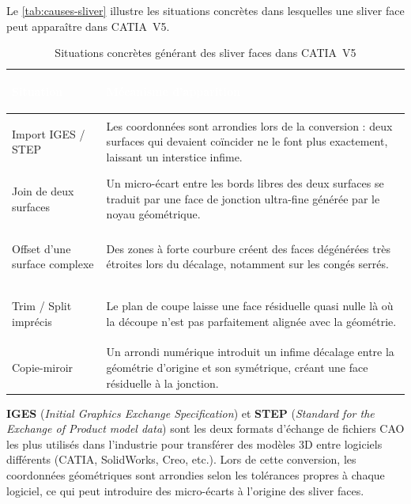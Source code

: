 Le \autoref{tab:causes-sliver} illustre les situations concrètes dans lesquelles une sliver face peut apparaître dans CATIA~V5.

\begin{table}[H]
    \centering
    \caption{Situations concrètes générant des sliver faces dans CATIA~V5}
    \label{tab:causes-sliver}
    \begin{tabularx}{\textwidth}{|>{\bfseries\raggedright\arraybackslash}p{3.8cm}|X|}
        \hline
        \rowcolor{headerblue}
        \textcolor{white}{\textbf{Situation}} & \centering\textcolor{white}{\textbf{Mécanisme d'apparition}} \tabularnewline
        \hline
        \rowcolor{rowlight}
        Import IGES / STEP & Les coordonnées sont arrondies lors de la conversion : deux surfaces qui devaient coïncider ne le font plus exactement, laissant un interstice infime. \\
        \hline
        \rowcolor{rowwhite}
        Join de deux surfaces & Un micro-écart entre les bords libres des deux surfaces se traduit par une face de jonction ultra-fine générée par le noyau géométrique. \\
        \hline
        \rowcolor{rowlight}
        Offset d'une surface complexe & Des zones à forte courbure créent des faces dégénérées très étroites lors du décalage, notamment sur les congés serrés. \\
        \hline
        \rowcolor{rowwhite}
        Trim / Split imprécis & Le plan de coupe laisse une face résiduelle quasi nulle là où la découpe n'est pas parfaitement alignée avec la géométrie. \\
        \hline
        \rowcolor{rowlight}
        Copie-miroir & Un arrondi numérique introduit un infime décalage entre la géométrie d'origine et son symétrique, créant une face résiduelle à la jonction. \\
        \hline
    \end{tabularx}
\end{table}

\begin{block}[note]
\textbf{IGES} (\textit{Initial Graphics Exchange Specification}) et \textbf{STEP} (\textit{Standard for the Exchange of Product model data}) sont les deux formats d'échange de fichiers CAO les plus utilisés dans l'industrie pour transférer des modèles 3D entre logiciels différents (CATIA, SolidWorks, Creo, etc.). Lors de cette conversion, les coordonnées géométriques sont arrondies selon les tolérances propres à chaque logiciel, ce qui peut introduire des micro-écarts à l'origine des sliver faces.
\end{block}

